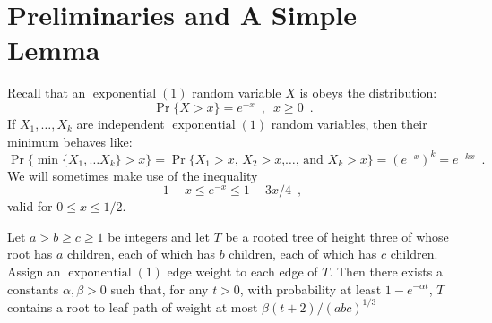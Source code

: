 \documentclass[a4paper,UKenglish]{lipics-v2016}
\DeclareMathOperator{\exponential}{exponential}
\begin{document}
\section{Preliminaries and A Simple Lemma}

Recall that an $\exponential(1)$ random variable $X$ is obeys the distribution:
\[
   \Pr\{X > x\} = e^{-x} \enspace,\enspace x \ge 0 \enspace .
\]
If $X_1,\ldots,X_k$ are independent $\exponential(1)$ random variables, then their minimum behaves like:
\[
   \Pr\{\min\{X_1,\ldots X_k\} > x\} = \Pr\{\text{$X_1>x$, $X_2>x$,\ldots, and $X_k>x$}\} = \left(e^{-x}\right)^k = e^{-kx} \enspace .
\]
We will sometimes make use of the inequality
\[
     1-x \le e^{-x} \le 1-3x/4 \enspace ,
\]
valid for $0\le x\le 1/2$.



\begin{lemma}\label{lem:abc}
Let $a>b\ge c\ge 1$ be integers and let $T$ be a rooted tree of height
three of whose root has $a$ children, each of which has $b$ children,
each of which has $c$ children.  Assign an $\exponential(1)$ edge weight
to each edge of $T$.  Then there exists a constants $\alpha,\beta>0$ such that, for any $t>0$, with probability at least $1-e^{-\alpha t}$, $T$
contains a root to leaf path of weight at most $\beta(t+2)/(abc)^{1/3}$
\end{lemma}
\end{document}

